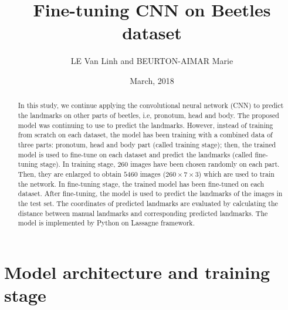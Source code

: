 \documentclass[12pt,a4paper]{article}
\begin{document}
\title{Fine-tuning CNN on Beetles dataset }
\author{LE Van Linh and BEURTON-AIMAR Marie}
\date{March, 2018}
\maketitle
\begin{abstract}
In this study, we continue applying the convolutional neural network (CNN) to predict the landmarks on other parts of beetles, i.e, pronotum, head and body. The proposed model was continuing to use to predict the landmarks. However, instead of training from scratch on each dataset, the model has been training with a combined data of three parts: pronotum, head and body part (called training stage); then, the trained model is used to fine-tune on each dataset and predict the landmarks (called fine-tuning stage). In training stage, $260$ images have been chosen randomly on each part. Then, they are enlarged to obtain $5460$ images ($260 \times 7 \times 3$) which are used to train the network. In fine-tuning stage, the trained model has been fine-tuned on each dataset. After fine-tuning, the model is used to predict the landmarks of the images in the test set. The coordinates of predicted landmarks are evaluated by calculating the distance between manual landmarks and corresponding predicted landmarks. The model is implemented by Python on Lassagne framework\cite{lasagne}.
\end{abstract}

\section{Model architecture and training stage}
\end{document}
